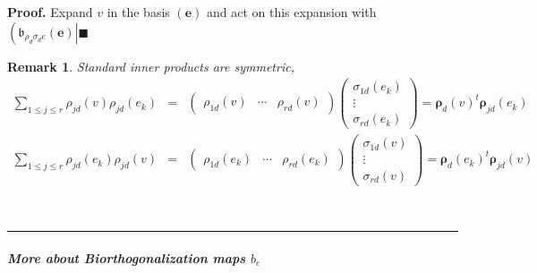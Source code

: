 \documentclass[aps,preprint]{revtex4}
\newtheorem{remark}[theorem]{Remark}
\newenvironment{proof}[1][Proof]{\noindent\textbf{#1.} }{\ \rule{0.5em}{0.5em}}
\begin{document}
\begin{proof}
Expand $v$ in the basis $\left( \boldsymbol{e}\right) $ and act on this
expansion with $\left( \mathfrak{b}_{\rho _{d}\sigma _{d}e}\left( 
\boldsymbol{e}\right) \right\vert \blacksquare $

\begin{remark}
Standard inner products are symmetric, 
\begin{eqnarray}
\sum_{1\leq j\leq r}\rho _{jd}\left( v\right) \rho _{jd}\left( e_{k}\right)
&=&\left( 
\begin{array}{ccc}
\rho _{1d}\left( v\right) & \cdots & \rho _{rd}\left( v\right)%
\end{array}%
\right) \left( 
\begin{array}{c}
\sigma _{1d}\left( e_{k}\right) \\ 
\vdots \\ 
\sigma _{rd}\left( e_{k}\right)%
\end{array}%
\right) =\boldsymbol{\rho }_{d}\left( v\right) ^{t}\boldsymbol{\rho }%
_{jd}\left( e_{k}\right) \\
\sum_{1\leq j\leq r}\rho _{jd}\left( e_{k}\right) \rho _{jd}\left( v\right)
&=&\left( 
\begin{array}{ccc}
\rho _{1d}\left( e_{k}\right) & \cdots & \rho _{rd}\left( e_{k}\right)%
\end{array}%
\right) \left( 
\begin{array}{c}
\sigma _{1d}\left( v\right) \\ 
\vdots \\ 
\sigma _{rd}\left( v\right)%
\end{array}%
\right) =\boldsymbol{\rho }_{d}\left( e_{k}\right) ^{t}\boldsymbol{\rho }%
_{jd}\left( v\right)
\end{eqnarray}
\end{remark}
\end{proof}

\subparagraph{More about Biorthogonalization maps $b_{e}$}
\end{document}
